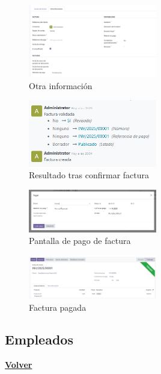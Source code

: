 \documentclass[a4paper,12pt]{article}
\begin{document}
\begin{figure}[h!]
    \centering
    \includegraphics[width=0.5\textwidth]{pr2odoo07-facturac05.png}
    \caption{Otra información}
\end{figure}
\FloatBarrier

\begin{figure}[h!]
    \centering
    \includegraphics[width=0.5\textwidth]{pr2odoo08-facturac06.png}
    \caption{Resultado tras confirmar factura}
\end{figure}
\FloatBarrier

\begin{figure}[h!]
    \centering
    \includegraphics[width=0.5\textwidth]{pr2odoo09-facturac07.png}
    \caption{Pantalla de pago de factura}
\end{figure}
\FloatBarrier

\begin{figure}[h!]
    \centering
    \includegraphics[width=0.5\textwidth]{pr2odoo10-facturac08.png}
    \caption{Factura pagada}
\end{figure}
\FloatBarrier


\subsection{Empleados}
\hyperlink{anchor-indice}{\textbf{Volver}}\\
\end{document}
